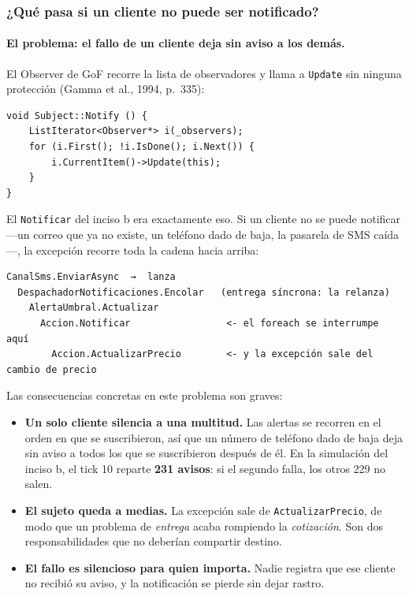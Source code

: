\subsubsection{¿Qué pasa si un cliente no puede ser notificado?}

\paragraph{El problema: el fallo de un cliente deja sin aviso a los demás.}
El Observer de GoF recorre la lista de observadores y llama a \texttt{Update} sin ninguna
protección (Gamma et al., 1994, p.~335):

\begin{lstlisting}[language={}, basicstyle=\ttfamily\footnotesize, columns=fullflexible, keepspaces=true, caption={El bucle de notificación del libro, sin red.}]
void Subject::Notify () {
    ListIterator<Observer*> i(_observers);
    for (i.First(); !i.IsDone(); i.Next()) {
        i.CurrentItem()->Update(this);
    }
}
\end{lstlisting}

El \texttt{Notificar} del inciso b era exactamente eso. Si un cliente no se puede notificar
---un correo que ya no existe, un teléfono dado de baja, la pasarela de SMS caída---, la
excepción recorre toda la cadena hacia arriba:

\begin{lstlisting}[language={}, numbers=none, basicstyle=\ttfamily\footnotesize, columns=fullflexible, keepspaces=true]
CanalSms.EnviarAsync  →  lanza
  DespachadorNotificaciones.Encolar   (entrega síncrona: la relanza)
    AlertaUmbral.Actualizar
      Accion.Notificar                 <- el foreach se interrumpe aquí
        Accion.ActualizarPrecio        <- y la excepción sale del cambio de precio
\end{lstlisting}

Las consecuencias concretas en este problema son graves:

\begin{itemize}
  \item \textbf{Un solo cliente silencia a una multitud.} Las alertas se recorren en el
        orden en que se suscribieron, así que un número de teléfono dado de baja deja sin
        aviso a todos los que se suscribieron después de él. En la simulación del inciso b,
        el tick 10 reparte \textbf{231 avisos}: si el segundo falla, los otros 229 no salen.
  \item \textbf{El sujeto queda a medias.} La excepción sale de \texttt{ActualizarPrecio},
        de modo que un problema de \emph{entrega} acaba rompiendo la \emph{cotización}. Son
        dos responsabilidades que no deberían compartir destino.
  \item \textbf{El fallo es silencioso para quien importa.} Nadie registra que ese cliente
        no recibió su aviso, y la notificación se pierde sin dejar rastro.
\end{itemize}

